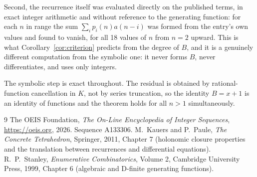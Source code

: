 \documentclass[11pt,a4paper]{article}
\theoremstyle{plain}
\theoremstyle{definition}
\begin{document}
Second, the recurrence itself was evaluated directly on the published terms, in exact
integer arithmetic and without reference to the generating function: for each $n$ in range
the sum $\sum_{i}p_{i}(n)a(n-i)$ was formed from the entry's own values and found to
vanish, for all 18 values of $n$ from $n=2$ upward. This is what
Corollary~\ref{cor:criterion} predicts from the degree of $B$, and it is a genuinely
different computation from the symbolic one: it never forms $B$, never differentiates, and
uses only integers.

The symbolic step is exact throughout. The residual is obtained by rational-function
cancellation in $K$, not by series truncation, so the identity $B=x + 1$ is an
identity of functions and the theorem holds for all $n>1$ simultaneously.

\begin{thebibliography}{9}
 The OEIS Foundation, \emph{The On-Line Encyclopedia of Integer Sequences},
\url{https://oeis.org}, 2026. Sequence A133306.
 M.~Kauers and P.~Paule, \emph{The Concrete Tetrahedron}, Springer, 2011,
Chapter 7 (holonomic closure properties and the translation between recurrences and
differential equations).
 R.~P.~Stanley, \emph{Enumerative Combinatorics}, Volume 2, Cambridge
University Press, 1999, Chapter 6 (algebraic and D-finite generating functions).
\end{thebibliography}
\end{document}
